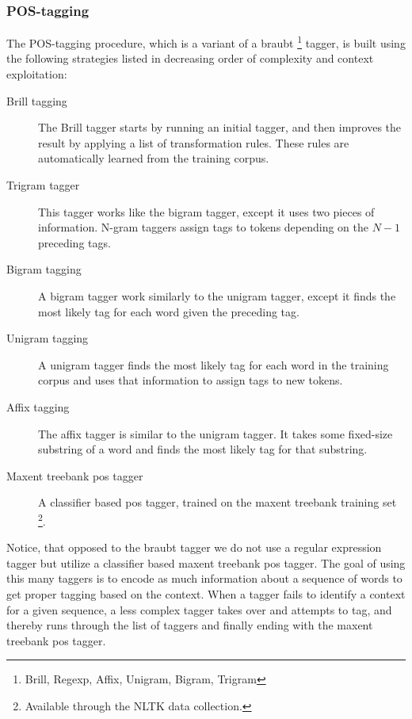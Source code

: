 \documentclass[10pt,letterpaper,two column,final]{article}
\begin{document}
\subsubsection{POS-tagging}
The POS-tagging procedure, which is a variant of a braubt
\footnote{Brill, Regexp, Affix, Unigram, Bigram, Trigram} tagger, is
built using the following strategies listed in decreasing order of
complexity and context exploitation:
\begin{description}
\item[Brill tagging] The Brill \cite{Brill:1992:SRP:974499.974526}
tagger starts by running an initial tagger, and then improves the result
by applying a list of transformation rules. These rules are
automatically learned from the training corpus.
\item[Trigram tagger] This tagger works like the bigram tagger, except it
uses two pieces of information. N-gram taggers assign tags to tokens
depending on the $N - 1$ preceding tags.
\item[Bigram tagging] A bigram tagger work similarly to the unigram
tagger, except it finds the most likely tag for each word given the
preceding tag.
\item[Unigram tagging] A unigram tagger finds the most likely tag for each word
in the training corpus and uses that information to assign tags to new
tokens.
\item[Affix tagging] The affix tagger is similar to the unigram tagger.
It takes some fixed-size substring of a word and finds the most likely
tag for that substring.
\item[Maxent treebank pos tagger] A classifier based pos tagger, trained
on the maxent treebank training set \footnote{Available through the NLTK
data collection.}.
\end{description}
Notice, that opposed to the
braubt tagger we do not use a regular expression tagger but utilize a
classifier based maxent treebank pos tagger. The goal of using this many
taggers is to encode as much information about a sequence of words to
get proper tagging based on the context. When a tagger fails to identify
a context for a given sequence, a less complex tagger takes over and
attempts to tag, and thereby runs through the list of taggers and
finally ending with the maxent treebank pos tagger.

\end{document}
